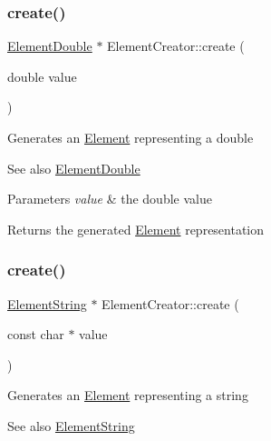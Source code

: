 \subsubsection{\texorpdfstring{create()}{create()}\hspace{0.1cm}{\footnotesize\ttfamily [3/6]}}
{\footnotesize\ttfamily \mbox{\hyperlink{classElementDouble}{Element\+Double}} $\ast$ Element\+Creator\+::create (\begin{DoxyParamCaption}\item[{double}]{value }\end{DoxyParamCaption})\hspace{0.3cm}{\ttfamily [static]}}

Generates an \mbox{\hyperlink{classElement}{Element}} representing a double \begin{DoxySeeAlso}{See also}
\mbox{\hyperlink{classElementDouble}{Element\+Double}}
\end{DoxySeeAlso}

\begin{DoxyParams}{Parameters}
{\em value} & the double value \\
\hline
\end{DoxyParams}
\begin{DoxyReturn}{Returns}
the generated \mbox{\hyperlink{classElement}{Element}} representation 
\end{DoxyReturn}
\mbox{\label{classElementCreator_a85bfd97a051e5ae5a790b919aa28fee2}} 
\subsubsection{\texorpdfstring{create()}{create()}\hspace{0.1cm}{\footnotesize\ttfamily [4/6]}}
{\footnotesize\ttfamily \mbox{\hyperlink{classElementString}{Element\+String}} $\ast$ Element\+Creator\+::create (\begin{DoxyParamCaption}\item[{const char $\ast$}]{value }\end{DoxyParamCaption})\hspace{0.3cm}{\ttfamily [static]}}

Generates an \mbox{\hyperlink{classElement}{Element}} representing a string \begin{DoxySeeAlso}{See also}
\mbox{\hyperlink{classElementString}{Element\+String}}
\end{DoxySeeAlso}

